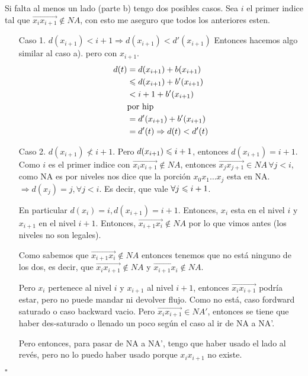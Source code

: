 \documentclass[12pt,a4paper]{article}
\begin{document}
Si falta al menos un lado (parte b) tengo dos posibles casos. Sea $i$ el primer 
indice tal que $\overrightarrow{x_{i}x_{i+1}} \notin NA$, con esto me aseguro 
que todos los anteriores esten.
\begin{itemize}
    \item [Caso 1.] $d(x_{i+1}) < i+1 \Rightarrow d(x_{i+1}) < d'(x_{i+1})$
        Entonces hacemos algo similar al caso a). pero con $x_{i+1}$.
        \begin{align*}
            d(t) &= d(x_{i+1}) + b(x_{i+1})\\
            &\leqslant d(x_{i+1}) + b'(x_{i+1})\\
            &< i + 1 + b'(x_{i+1})\\
            &\text{por hip}\\
            &=d'(x_{i+1}) + b'(x_{i+1})\\
            &=d'(t) \Rightarrow d(t) < d'(t)\\
        \end{align*}
    \item [Caso 2.] 
        $d(x_{i+1}) \nless i+1$.
        Pero $d(x_{i+1}) \leqslant i+1$, entonces $d(x_{i+1}) = i+1$. Como $i$ es el 
        primer indice con $\overrightarrow{x_{i}x_{i+1}} \notin NA$, entonces 
        $\overrightarrow{x_{j}x_{j+1}} \in NA\, \forall j<i$, como NA es por 
        niveles nos dice que la porción $x_{0}x_{1}\ldots x_{j}$ esta en NA.
        $\Rightarrow d(x_{j}) = j, \forall j<i$. Es decir, que vale 
        $\forall j \leqslant i+1$.
        \medskip

        En particular $d(x_{i}) = i, d(x_{i+1}) = i+1$. Entonces, $x_{i}$ esta 
        en el nivel $i$ y $x_{i+1}$ en el nivel $i+1$. Entonces, 
        $\overrightarrow{x_{i+1}x_{i}} \notin NA$ por lo que vimos antes
        (los niveles no son legales).
        \medskip

        Como sabemos que $\overrightarrow{x_{i+1}x_{i}} \notin NA$ entonces 
        tenemos que no está ninguno de los dos, es decir, que 
        $\overrightarrow{x_{i}x_{i+1}} \notin NA$ y 
        $\overrightarrow{x_{i+1}x_{i}} \notin NA$.
        \medskip

        Pero $x_{i}$ pertenece al nivel $i$ y $x_{i+1}$ al nivel $i+1$, entonces
        $\overrightarrow{x_{i}x_{i+1}}$ podría estar, pero no puede mandar ni 
        devolver flujo. Como no está, caso fordward saturado o caso backward
        vacio. Pero $\overrightarrow{x_{i}x_{i+1}} \in NA'$, entonces se 
        tiene que haber des-saturado o llenado un poco según el caso al ir de 
        NA a NA'.
        \medskip

        Pero entonces, para pasar de NA a NA', tengo que haber usado el lado al 
        revés, pero no lo puedo haber usado porque $x_{i}x_{i+1}$ no existe.
\end{itemize}
$\square$
\end{document}
